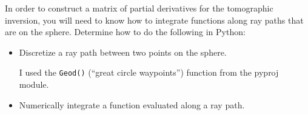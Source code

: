\documentclass[11pt,titlepage,fleqn]{article}
\begin{document}
In order to construct a matrix of partial derivatives for the tomographic inversion, you will need to know how to integrate functions along ray paths that are on the sphere. Determine how to do the following in Python:

\begin{itemize}
\item Discretize a ray path between two points on the sphere.

I used the \verb+Geod()+ (``great circle waypoints'') function from the pyproj module.

\item Numerically integrate a function evaluated along a ray path.

\end{itemize}



\end{document}
